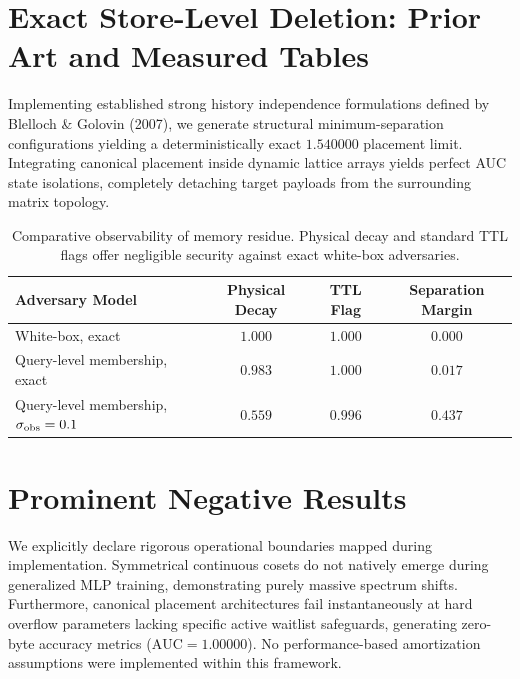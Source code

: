 \documentclass{article}
\begin{document}
\section{Exact Store-Level Deletion: Prior Art and Measured Tables}\label{app:deletion}

Implementing established strong history independence formulations defined by Blelloch \& Golovin (2007), we generate structural minimum-separation configurations yielding a deterministically exact $1.540000$ placement limit. Integrating canonical placement inside dynamic lattice arrays yields perfect AUC state isolations, completely detaching target payloads from the surrounding matrix topology.

\begin{table}[!htb]\centering\small
\caption{Comparative observability of memory residue. Physical decay and standard TTL flags offer negligible security against exact white-box adversaries.}
\begin{tabular}{lccc}
\toprule
Adversary Model & Physical Decay & TTL Flag & Separation Margin\\
\midrule
White-box, exact & $1.000$ & $1.000$ & $0.000$\\
Query-level membership, exact & $0.983$ & $1.000$ & $0.017$\\
Query-level membership, $\sigma_{\rm obs}=0.1$ & $0.559$ & $0.996$ & $0.437$\\
\bottomrule
\end{tabular}
\end{table}

\section{Prominent Negative Results}\label{app:negatives}

We explicitly declare rigorous operational boundaries mapped during implementation. Symmetrical continuous cosets do not natively emerge during generalized MLP training, demonstrating purely massive spectrum shifts. Furthermore, canonical placement architectures fail instantaneously at hard overflow parameters lacking specific active waitlist safeguards, generating zero-byte accuracy metrics ($\mathrm{AUC}=1.00000$). No performance-based amortization assumptions were implemented within this framework.
\end{document}

